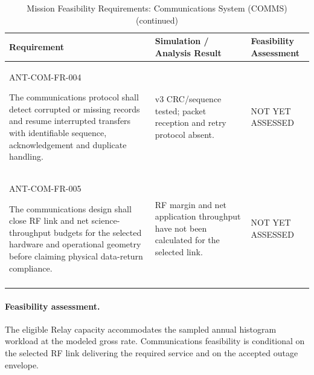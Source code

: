 \begin{table}[H]\centering\small\setlength{\tabcolsep}{3pt}
\ContinuedFloat\captionsetup{list=no}
\caption{Mission Feasibility Requirements: Communications System (COMMS) (continued)}
\begin{tabular}{@{}
>{\RaggedRight\arraybackslash}p{}
>{\RaggedRight\arraybackslash}p{}
>{\RaggedRight\arraybackslash}p{}
@{}}
\toprule Requirement & Simulation / Analysis Result & Feasibility Assessment\\\midrule
{}\label{req:ANT-COM-FR-004}\mbox{ANT-COM-}\newline\mbox{FR-004}\par The communications protocol shall detect corrupted or missing records and resume interrupted transfers with identifiable sequence, acknowledgement and duplicate handling. & v3 CRC/sequence tested; packet reception and retry protocol absent. & NOT YET ASSESSED\\
\addlinespace[3pt]
\label{req:ANT-COM-FR-005}\mbox{ANT-COM-}\newline\mbox{FR-005}\par The communications design shall close RF link and net science-throughput budgets for the selected hardware and operational geometry before claiming physical data-return compliance. & RF margin and net application throughput have not been calculated for the selected link. & NOT YET ASSESSED\\
\addlinespace[3pt]
\bottomrule
\end{tabular}
\end{table}
\paragraph{Feasibility assessment.} The eligible Relay capacity accommodates the sampled annual histogram workload at the modeled gross rate. Communications feasibility is conditional on the selected RF link delivering the required service and on the accepted outage envelope.
